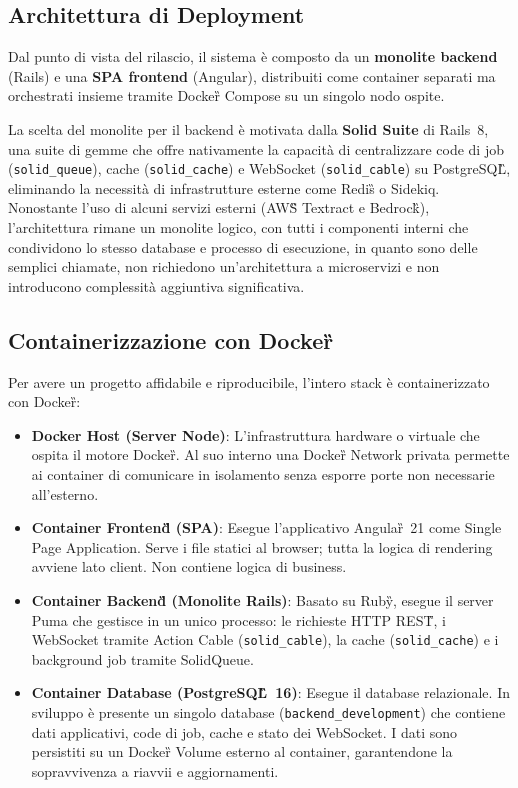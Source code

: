 \documentclass[a4paper,11pt]{article}
\begin{document}
\subsection{Architettura di Deployment}
Dal punto di vista del rilascio, il sistema è composto da un \textbf{monolite backend} (Rails) e una \textbf{SPA frontend} (Angular), distribuiti come container separati ma orchestrati insieme tramite Docker\G{} Compose su un singolo nodo ospite.

La scelta del monolite per il backend è motivata dalla \textbf{Solid Suite} di Rails~8, una suite di gemme
che offre nativamente la capacità di centralizzare code di job (\texttt{solid\_queue}), 
cache (\texttt{solid\_cache}) e WebSocket (\texttt{solid\_cable}) su PostgreSQL\G{}, 
eliminando la necessità di infrastrutture esterne come Redis\G{} o Sidekiq.
Nonostante l'uso di alcuni servizi esterni (AWS\G{} Textract e Bedrock\G{}), l'architettura rimane un monolite logico, 
con tutti i componenti interni che condividono lo stesso database e processo di esecuzione, in quanto sono delle semplici chiamate, 
non richiedono un'architettura a microservizi e non introducono complessità aggiuntiva significativa.

\subsection{Containerizzazione con Docker\G{}}
Per avere un progetto affidabile e riproducibile, l'intero stack è containerizzato con Docker\G{}:
\begin{itemize}
  \item \textbf{Docker Host (Server Node)}: L'infrastruttura hardware o virtuale che ospita il motore
  Docker\G{}. Al suo interno una Docker\G{} Network privata permette ai container di comunicare
  in isolamento senza esporre porte non necessarie all'esterno.

  \item \textbf{Container Frontend\G{} (SPA)}: Esegue l'applicativo Angular\G{}~21 come
  Single Page Application. Serve i file statici al browser; tutta la logica di rendering avviene
  lato client. Non contiene logica di business.

  \item \textbf{Container Backend\G{} (Monolite Rails)}: Basato su Ruby\G{}, esegue il server
    Puma che gestisce in un unico processo: le richieste HTTP REST\G{}, i WebSocket tramite
    Action Cable (\texttt{solid\_cable}), la cache (\texttt{solid\_cache}) e i background job
    tramite SolidQueue.

  \item \textbf{Container Database (PostgreSQL\G{}~16)}: Esegue il database relazionale.
  In sviluppo è presente un singolo database (\texttt{backend\_development}) che contiene dati
  applicativi, code di job, cache e stato dei WebSocket.
  I dati sono persistiti su un Docker\G{} Volume esterno al container, garantendone la
  sopravvivenza a riavvii e aggiornamenti.
\end{itemize}
\end{document}

